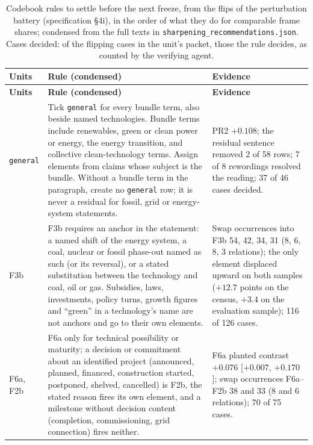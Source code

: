 \begingroup\scriptsize
\setlength{\tabcolsep}{4pt}
\begin{longtable}{@{}>{\raggedright\arraybackslash}p{14mm}>{\raggedright\arraybackslash}p{84mm}>{\raggedright\arraybackslash}p{50mm}@{}}
\caption[Battery: rules to settle before the next freeze]{Codebook rules to settle before the next freeze, from the flips of the perturbation battery (specification §4i), in the order of what they do for comparable frame shares; condensed from the full texts in \texttt{sharpening\_recommendations.json}. Cases decided: of the flipping cases in the unit's packet, those the rule decides, as counted by the verifying agent.}\label{tab:battery_sharpen} \\
\toprule
\textbf{Units} & \textbf{Rule (condensed)} & \textbf{Evidence} \\
\midrule
\endfirsthead
\toprule
\textbf{Units} & \textbf{Rule (condensed)} & \textbf{Evidence} \\
\midrule
\endhead
\bottomrule
\endfoot
\texttt{general} & Tick \texttt{general} for every bundle term, also beside named technologies. Bundle terms include renewables, green or clean power or energy, the energy transition, and collective clean-technology terms. Assign elements from claims whose subject is the bundle. Without a bundle term in the paragraph, create no \texttt{general} row; it is never a residual for fossil, grid or energy-system statements. & PR2 $+0.108$; the residual sentence removed 2 of 58 rows; 7 of 8 rewordings resolved the reading; 37 of 46 cases decided. \\
F3b & F3b requires an anchor in the statement: a named shift of the energy system, a coal, nuclear or fossil phase-out named as such (or its reversal), or a stated substitution between the technology and coal, oil or gas. Subsidies, laws, investments, policy turns, growth figures and ``green'' in a technology's name are not anchors and go to their own elements. & Swap occurrences into F3b 54, 42, 34, 31 (8, 6, 8, 3 relations); the only element displaced upward on both samples ($+12.7$ points on the census, $+3.4$ on the evaluation sample); 116 of 126 cases. \\
F6a, F2b & F6a only for technical possibility or maturity; a decision or commitment about an identified project (announced, planned, financed, construction started, postponed, shelved, cancelled) is F2b, the stated reason fires its own element, and a milestone without decision content (completion, commissioning, grid connection) fires neither. & F6a planted contrast $+0.076$ [$+0.007$, $+0.170$]; swap occurrences F6a--F2b 38 and 33 (8 and 6 relations); 70 of 75 cases. \\

\end{longtable}
